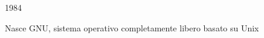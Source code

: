 \documentclass{beamer}
\begin{document}
\begin{frame}
\begin{minipage}{.55\linewidth}
\begin{block}{1984}
\begin{minipage}{.2\linewidth}
        \end{minipage}
        \begin{minipage}{.75\linewidth}
        Nasce GNU, sistema operativo completamente libero basato su Unix
        \end{minipage}
    \end{block}
    \end{minipage}
\end{frame}
\end{document}
